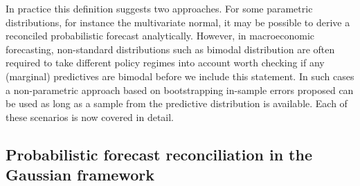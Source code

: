 \documentclass[graybox]{svmult}
\begin{document}
In practice this definition suggests two approaches.  For some parametric distributions, for instance the multivariate normal, it may be possible to derive a reconciled probabilistic forecast analytically.  However, in macroeconomic forecasting, non-standard distributions such as bimodal distribution are often required to take different policy regimes into account {\color{red} worth checking if any (marginal) predictives are bimodal before we include this statement}.  In such cases a non-parametric approach based on bootstrapping in-sample errors proposed \cite{Gamakumara2018} can be used as long as a sample from the predictive distribution is available.  Each of these scenarios is now covered in detail.

\subsection{Probabilistic forecast reconciliation in the Gaussian framework}\label{sec:probrecgauss}


\end{document}
